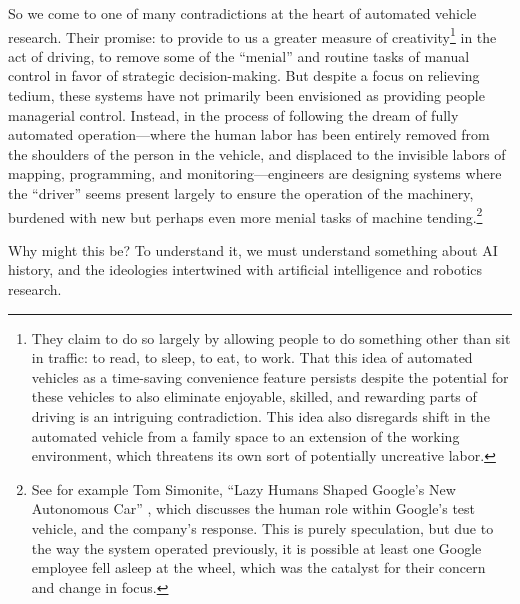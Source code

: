 So we come to one of many contradictions at the heart of
automated vehicle research. Their promise:
to provide to us a greater measure of creativity\footnote{They claim
  to do so largely by allowing people to do something other than sit
  in traffic: to read, to sleep, to eat, to work. That this idea of
  automated vehicles as a time-saving convenience feature persists
  despite the potential for these vehicles to also eliminate
  enjoyable, skilled, and rewarding parts of driving is an intriguing
  contradiction. This idea also disregards shift in the automated
  vehicle from a family space to an extension of the working environment,
  which threatens its own sort of potentially uncreative labor.} in the act of
driving, to remove some of the ``menial'' and routine tasks of manual
control in favor of strategic decision-making. But
despite a focus on relieving tedium, these systems
have not primarily been envisioned as providing people managerial
control. Instead, in the process of following 
the dream of fully automated operation---where the human labor has been
entirely removed from the shoulders of the person in the vehicle, and
displaced to the invisible labors of mapping, programming, and
monitoring---engineers are designing systems where the ``driver''
seems present largely to ensure the operation of the
machinery, burdened with new but perhaps even more menial tasks of
machine tending.\footnote{See for example Tom Simonite, ``Lazy Humans
Shaped Google's New Autonomous Car'' \cite{simonite}, which discusses
the human role within Google's test vehicle,
and the company's response. This is purely speculation, but due to
the way the system operated previously, it is possible at least one Google
employee fell asleep at the wheel, which was the catalyst for their
concern and change in focus.} 

Why might this be? To understand it, we must understand something
about AI history, and the ideologies intertwined with artificial
intelligence and robotics research.


